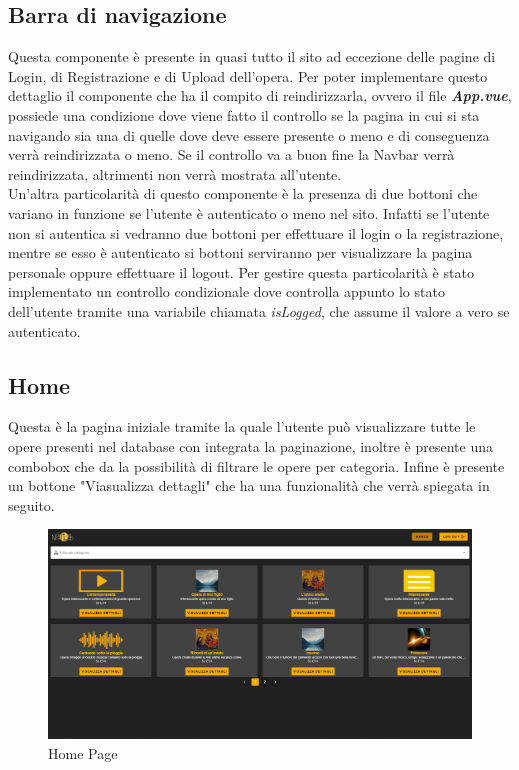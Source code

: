 \subsection{Barra di navigazione}
Questa componente è presente in quasi tutto il sito ad eccezione delle pagine di Login, di Registrazione e di Upload dell'opera. Per poter implementare questo dettaglio il componente che ha il compito di reindirizzarla, ovvero il file \textbf{\textit{App.vue}}, possiede una condizione dove viene fatto il controllo se la pagina in cui si sta navigando sia una di quelle dove deve essere presente o meno e di conseguenza verrà reindirizzata o meno. Se il controllo va a buon fine la Navbar verrà reindirizzata, altrimenti non verrà mostrata all'utente.\\
Un'altra particolarità di questo componente è la presenza di due bottoni che variano in funzione se l'utente è autenticato o meno nel sito. Infatti se l'utente non si autentica si vedranno due bottoni per effettuare il login o la registrazione, mentre se esso è autenticato si bottoni serviranno per visualizzare la pagina personale oppure effettuare il logout. Per gestire questa particolarità è stato implementato un controllo condizionale dove controlla appunto lo stato dell'utente tramite una variabile chiamata \textit{isLogged}, che assume il valore a vero se autenticato.
\subsection{Home}
Questa è la pagina iniziale tramite la quale l'utente può visualizzare tutte le opere presenti nel database con integrata la paginazione, inoltre è presente una combobox che da la possibilità di filtrare le opere per categoria. Infine è presente un bottone "Viasualizza dettagli" che ha una funzionalità che verrà spiegata in seguito.
\begin{figure}[H]
	\begin{center}
		\includegraphics[width=0.7\columnwidth]{immagini/home.png}
		\caption{Home Page}
	\end{center}
\end{figure}
